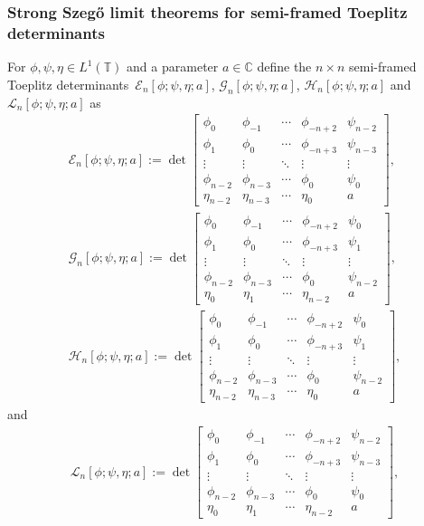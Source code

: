 \documentclass[pdftex]{sigma}
\numberwithin{equation}{section}
\newcommand{\C}{{\mathbb C}}
\newcommand{\T}{{\mathbb T}}
\begin{document}
	\subsubsection{Strong Szeg\H{o} limit theorems for semi-framed Toeplitz determinants}	
	For $\phi,\psi,\eta \in L^1(\T)$ and a parameter $a \in \C$ define the $n\times n$ semi-framed Toeplitz determinants~${\mathscr{E}_n[\phi;\psi,\eta;a]}$, $\mathscr{G}_n[\phi;\psi,\eta;a]$, $\mathscr{H}_n[\phi;\psi,\eta;a]$ and $\mathscr{L}_n[\phi;\psi,\eta;a]$ as
	\begin{gather*}%
		\mathscr{E}_n[\phi;\psi,\eta;a] := \det \begin{bmatrix}
			\phi_0& \phi_{-1} & \cdots & \phi_{-n+2} & \psi_{n-2} \\
			\phi_{1}& \phi_0 & \cdots & \phi_{-n+3} & \psi_{n-3} \\
			\vdots & \vdots & \ddots & \vdots & \vdots \\
			\phi_{n-2} & \phi_{n-3} & \cdots & \phi_{0} & \psi_{0} \\
			\eta_{n-2} & \eta_{n-3} & \cdots & \eta_{0} & a
		\end{bmatrix},
\\
		\mathscr{G}_n[\phi;\psi,\eta;a] := \det \begin{bmatrix}
			\phi_0& \phi_{-1} & \cdots & \phi_{-n+2} & \psi_{0} \\
			\phi_{1}& \phi_0 & \cdots & \phi_{-n+3} & \psi_{1} \\
			\vdots & \vdots & \ddots & \vdots & \vdots \\
			\phi_{n-2} & \phi_{n-3} & \cdots & \phi_{0} & \psi_{n-2} \\
			\eta_{0} & \eta_{1} & \cdots & \eta_{n-2} & a
		\end{bmatrix},
\\
		\mathscr{H}_n[\phi;\psi,\eta;a] := \det \begin{bmatrix}
			\phi_0& \phi_{-1} & \cdots & \phi_{-n+2} & \psi_{0} \\
			\phi_{1}& \phi_0 & \cdots & \phi_{-n+3} & \psi_{1} \\
			\vdots & \vdots & \ddots & \vdots & \vdots \\
			\phi_{n-2} & \phi_{n-3} & \cdots & \phi_{0} & \psi_{n-2} \\
			\eta_{n-2} & \eta_{n-3} & \cdots & \eta_{0} & a
		\end{bmatrix},
	\end{gather*}
	and
	\begin{gather*}%
		\mathscr{L}_n[\phi;\psi,\eta;a] := \det \begin{bmatrix}
			\phi_0& \phi_{-1} & \cdots & \phi_{-n+2} & \psi_{n-2} \\
			\phi_{1}& \phi_0 & \cdots & \phi_{-n+3} & \psi_{n-3} \\
			\vdots & \vdots & \ddots & \vdots & \vdots \\
			\phi_{n-2} & \phi_{n-3} & \cdots & \phi_{0} & \psi_{0} \\
			\eta_{0} & \eta_{1} & \cdots & \eta_{n-2} & a
		\end{bmatrix},
	\end{gather*}
\end{document}
